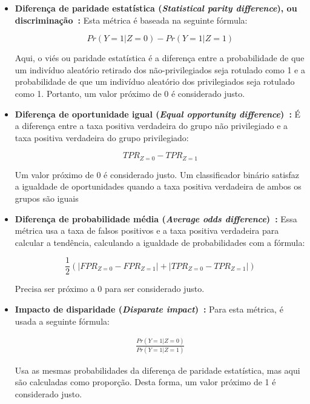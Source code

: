 \documentclass{article}
\begin{document}
\begin{itemize}
\item \textbf{Diferença de paridade estatística (\textit{Statistical parity difference}), ou discriminação~\citep{Zemel_2013}:} Esta métrica é baseada na seguinte fórmula:

\begin{equation}
Pr(Y=1|Z=0)-Pr(Y=1|Z=1)
\end{equation}
 
Aqui, o viés ou paridade estatística é a diferença entre a probabilidade de que um indivíduo aleatório retirado dos não-privilegiados seja rotulado como 1 e a probabilidade de que um indivíduo aleatório dos privilegiados seja rotulado como 1. Portanto, um valor próximo de 0 é considerado justo.

\item \textbf{Diferença de oportunidade igual (\textit{Equal opportunity difference})~\citep{Biswas_2020}:} É a diferença entre a taxa positiva verdadeira do grupo não privilegiado e a taxa positiva verdadeira do grupo privilegiado:

\begin{equation}
TPR_{Z=0} - TPR_{Z=1}
\end{equation}
 
Um valor próximo de 0 é considerado justo. Um classificador binário satisfaz a igualdade de oportunidades quando a taxa positiva verdadeira de ambos os grupos são iguais~\citep{Hardt_2016}

\item \textbf{Diferença de probabilidade média (\textit{Average odds difference})~\citep{Biswas_2020}:} Essa métrica usa a taxa de falsos positivos e a taxa positiva verdadeira para calcular a tendência, calculando a igualdade de probabilidades com a fórmula:

\begin{equation}
\frac{1}{2}(|FPR_{Z=0} - FPR_{Z=1}|+|TPR_{Z=0} - TPR_{Z=1}|)
\end{equation}
 
Precisa ser próximo a 0 para ser considerado justo.

\item \textbf{Impacto de disparidade (\textit{Disparate impact})~\citep{Biswas_2020}:} Para esta métrica, é usada a seguinte fórmula:

\begin{align*}
\frac{Pr(Y=1|Z=0)}{Pr(Y=1|Z=1)}
\end{align*}

Usa as mesmas probabilidades da diferença de paridade estatística, mas aqui são calculadas como proporção. Desta forma, um valor próximo de 1 é considerado justo.


\end{itemize}
\end{document}

